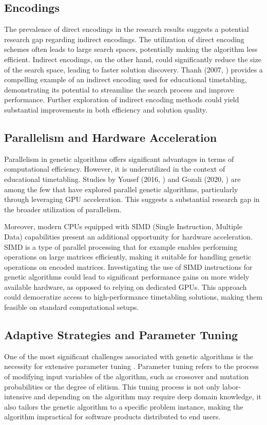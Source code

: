 \documentclass[sigconf]{acmart}
\begin{document}
\subsection{Encodings}
The prevalence of direct encodings in the research results suggests a potential
research gap regarding indirect encodings.
The utilization of direct encoding schemes often leads to large search spaces,
potentially making the algorithm less efficient.
%
Indirect encodings, on the other hand, could significantly reduce the size of
the search space, leading to faster solution discovery.
Thanh (2007, \cite{Thanh2007}) provides a compelling example of an indirect
encoding used for educational timetabling, demonstrating its potential to
streamline the search process and improve performance.
Further exploration of indirect encoding methods could yield substantial
improvements in both efficiency and solution quality.

\subsection{Parallelism and Hardware Acceleration}
Parallelism in genetic algorithms offers significant advantages in terms of
computational efficiency. However, it is underutilized
in the context of educational timetabling. Studies by Yousef
(2016, \cite{yousef2016gpu}) and Gozali (2020, \cite{gozali2020islandmodel})
are among the few that have explored parallel genetic algorithms, particularly
through leveraging GPU acceleration. This suggests a substantial research gap
in the broader utilization of parallelism.

Moreover, modern CPUs equipped with SIMD (Single Instruction, Multiple Data)
capabilities present an additional opportunity for hardware acceleration.
SIMD is a type of parallel processing that for example enables performing
operations on large matrices efficiently, making it suitable for handling
genetic operations on encoded matrices.
Investigating the use of SIMD instructions for genetic algorithms could lead
to significant performance gains on more widely available hardware, as opposed
to relying on dedicated GPUs.
This approach could democratize access to high-performance timetabling
solutions, making them feasible on standard computational setups.

\subsection{Adaptive Strategies and Parameter Tuning}
One of the most significant challenges associated with genetic algorithms is
the necessity for extensive parameter tuning \cite{Katoch2021}.
Parameter tuning refers to the process of modifying input variables of the
algorithm, such as crossover and mutation probabilities or the degree of
elitism.
%
This tuning process is not only labor-intensive and depending on the algorithm
may require deep domain knowledge, it also tailors the genetic algorithm to a
specific problem instance, making the algorithm impractical for software
products distributed to end users.
\end{document}
